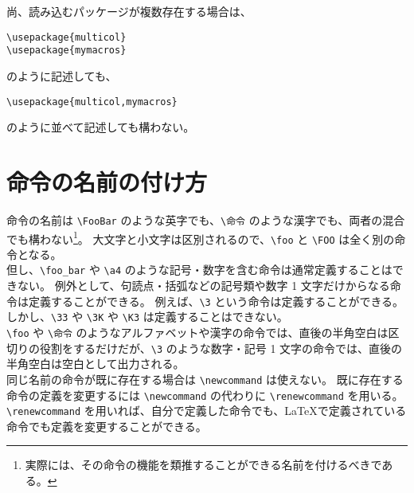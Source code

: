 尚、読み込むパッケージが複数存在する場合は、
\begin{mdframed}[roundcorner=0.50zw,leftmargin=3.00zw,rightmargin=3.00zw,skipabove=0.40zw,skipbelow=0.40zw,innertopmargin=4.00pt,innerbottommargin=4.00pt,innerleftmargin=5.00pt,innerrightmargin=5.00pt,linecolor=gray!020,linewidth=0.50pt,backgroundcolor=gray!20]
\begin{verbatim}
\usepackage{multicol}
\usepackage{mymacros}
\end{verbatim}
\end{mdframed}
のように記述しても、
\begin{mdframed}[roundcorner=0.50zw,leftmargin=3.00zw,rightmargin=3.00zw,skipabove=0.40zw,skipbelow=0.40zw,innertopmargin=4.00pt,innerbottommargin=4.00pt,innerleftmargin=5.00pt,innerrightmargin=5.00pt,linecolor=gray!020,linewidth=0.50pt,backgroundcolor=gray!20]
\begin{verbatim}
\usepackage{multicol,mymacros}
\end{verbatim}
\end{mdframed}
のように並べて記述しても構わない。
\section{命令の名前の付け方}
命令の名前は \verb`\FooBar` のような英字でも、\verb`\命令` のような漢字でも、両者の混合でも構わない\footnote{実際には、その命令の機能を類推することができる名前を付けるべきである。}。
大文字と小文字は区別されるので、\verb`\foo` と \verb`\FOO` は全く別の命令となる。\\

但し、\verb`\foo_bar` や \verb`\a4` のような記号・数字を含む命令は通常定義することはできない。
例外として、句読点・括弧などの記号類や数字 1 文字だけからなる命令は定義することができる。
例えば、\verb`\3` という命令は定義することができる。
しかし、\verb`\33` や \verb`\3K` や \verb`\K3` は定義することはできない。\\

\verb`\foo` や \verb`\命令` のようなアルファベットや漢字の命令では、直後の半角空白は区切りの役割をするだけだが、\verb`\3` のような数字・記号 1 文字の命令では、直後の半角空白は空白として出力される。\\

同じ名前の命令が既に存在する場合は \verb`\newcommand` は使えない。
既に存在する命令の定義を変更するには \verb`\newcommand` の代わりに \verb`\renewcommand` を用いる。
\verb`\renewcommand` を用いれば、自分で定義した命令でも、\LaTeX{}で定義されている命令でも定義を変更することができる。
